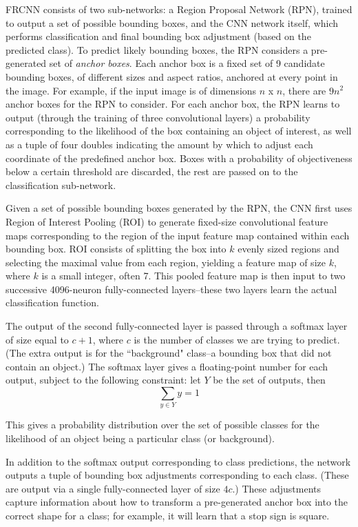 FRCNN consists of two sub-networks: a Region Proposal Network (RPN), trained to output a set of possible bounding boxes, and the CNN network itself, which performs classification and final bounding box adjustment (based on the predicted class). To predict likely bounding boxes, the RPN considers a pre-generated set of \textit{anchor boxes}. Each anchor box is a fixed set of 9 candidate bounding boxes, of different sizes and aspect ratios, anchored at every point in the image. For example, if the input image is of dimensions $n$ x $n$, there are $9n^2$ anchor boxes for the RPN to consider. For each anchor box, the RPN learns to output (through the training of three convolutional layers) a probability corresponding to the likelihood of the box containing an object of interest, as well as a tuple of four doubles indicating the amount by which to adjust each coordinate of the predefined anchor box. Boxes with a probability of objectiveness below a certain threshold are discarded, the rest are passed on to the classification sub-network.

Given a set of possible bounding boxes generated by the RPN, the CNN first uses Region of Interest Pooling (ROI) to generate fixed-size convolutional feature maps corresponding to the region of the input feature map contained within each bounding box. ROI consists of splitting the box into $k$ evenly sized regions and selecting the maximal value from each region, yielding a feature map of size $k$, where $k$ is a small integer, often 7. This pooled feature map is then input to two successive 4096-neuron fully-connected layers--these two layers learn the actual classification function. 

The output of the second fully-connected layer is passed through a softmax layer of size equal to $c + 1$, where $c$ is the number of classes we are trying to predict. (The extra output is for the ``background" class--a bounding box that did not contain an object.)  The softmax layer gives a floating-point number for each output, subject to the following constraint: let $Y$ be the set of outputs, then 
\begin{equation}
    \sum\limits_{y \in Y} y = 1
\end{equation}

This gives a probability distribution over the set of possible classes for the likelihood of an object being a particular class (or background).

In addition to the softmax output corresponding to class predictions, the network outputs a tuple of bounding box adjustments corresponding to each class. (These are output via a single fully-connected layer of size $4c$.) These adjustments capture information about how to transform a pre-generated anchor box into the correct shape for a class; for example, it will learn that a stop sign is square.

